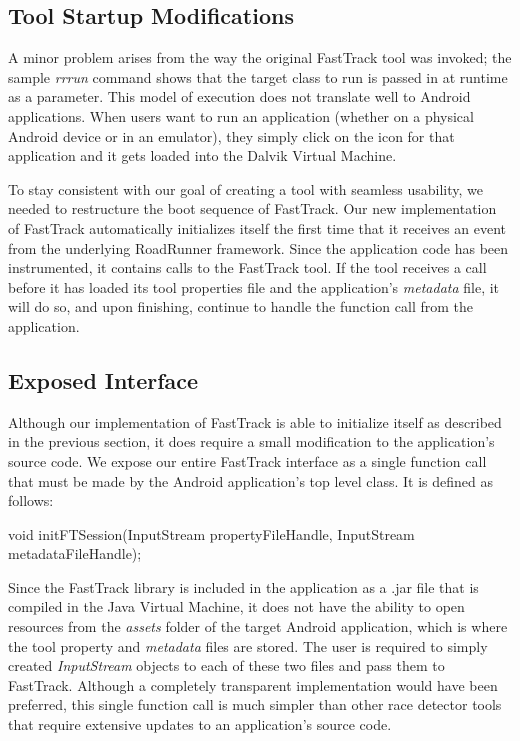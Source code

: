 \documentclass{acm_proc_article-sp}
\begin{document}
\subsection{Tool Startup Modifications}
A minor problem arises from the way the original FastTrack tool was invoked; the sample \emph{rrrun} command shows that the target class to run is passed in at runtime as a parameter. This model of execution does not translate well to Android applications. When users want to run an application (whether on a physical Android device or in an emulator), they simply click on the icon for that application and it gets loaded into the Dalvik Virtual Machine. 

To stay consistent with our goal of creating a tool with seamless usability, we needed to restructure the boot sequence of FastTrack. Our new implementation of FastTrack automatically initializes itself the first time that it receives an event from the underlying RoadRunner framework. Since the application code has been instrumented, it contains calls to the FastTrack tool. If the tool receives a call before it has loaded its tool properties file and the application's \emph{metadata} file, it will do so, and upon finishing, continue to handle the function call from the application. 

\subsection{Exposed Interface}
Although our implementation of FastTrack is able to initialize itself as described in the previous section, it does require a small modification to the application's source code. We expose our entire FastTrack interface as a single function call that must be made by the Android application's top level class. It is defined as follows:

\begin{code}
void initFTSession(InputStream propertyFileHandle,
	           InputStream metadataFileHandle);
\end{code}

Since the FastTrack library is included in the application as a .jar file that is compiled in the Java Virtual Machine, it does not have the ability to open resources from the \emph{assets} folder of the target Android application, which is where the tool property and \emph{metadata} files are stored. The user is required to simply created \emph{InputStream} objects to each of these two files and pass them to FastTrack. Although a completely transparent implementation would have been preferred, this single function call is much simpler than other race detector tools that require extensive updates to an application's source code.
\end{document}
